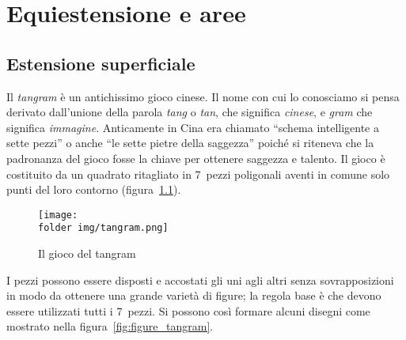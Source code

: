 
\chapter{Equiestensione e aree}
\label{chap:equiestensione_aree}



\section{Estensione superficiale}
\label{sect:estensione_superficiale}

Il \emph{tangram}\label{tangram} è un antichissimo gioco cinese. Il 
nome con cui lo conosciamo si pensa derivato dall'unione della parola 
\emph{tang} o \emph{tan}, che significa \emph{cinese}, e \emph{gram} 
che significa \emph{immagine}. Anticamente in Cina era chiamato 
``schema intelligente a sette pezzi'' o anche ``le sette pietre della 
saggezza'' poiché si riteneva che la padronanza del gioco fosse la 
chiave per ottenere saggezza e talento.
Il gioco è costituito da un quadrato ritagliato in 7~pezzi poligonali 
aventi in comune solo punti del loro contorno 
(figura~\ref{fig:tangram}).


\begin{inaccessibleblock}
 \begin{figure}[!htb]
  \centering\texttt{[image: \\folder img/tangram.png]}
  \caption{Il gioco del tangram}\label{fig:tangram}
\end{figure}
\end{inaccessibleblock}

I pezzi possono essere disposti e accostati gli uni agli altri senza 
sovrapposizioni in modo da ottenere una grande varietà di figure; la 
regola base è che devono essere utilizzati tutti i 7~pezzi. Si 
possono così formare alcuni disegni come mostrato nella 
figura~\ref{fig:figure_tangram}.


